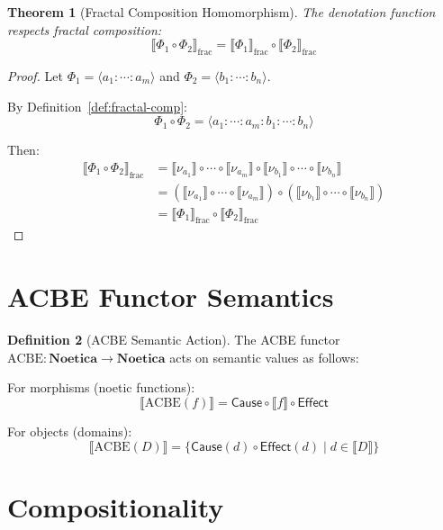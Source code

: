 \documentclass[11pt,twoside,openright]{book}
\theoremstyle{definition}
\newtheorem{definition}{Definition}[chapter]
\theoremstyle{plain}
\newtheorem{theorem}[definition]{Theorem}
\theoremstyle{remark}
\newcommand{\noe}[1]{\nu_{#1}}
\newcommand{\Frac}{\Phi}
\begin{document}
\begin{theorem}[Fractal Composition Homomorphism]
\label{thm:fractal-homomorphism}
The denotation function respects fractal composition:
\[
\llbracket \Frac_1 \circ \Frac_2 \rrbracket_{\text{frac}} = \llbracket \Frac_1 \rrbracket_{\text{frac}} \circ \llbracket \Frac_2 \rrbracket_{\text{frac}}
\]
\end{theorem}

\begin{proof}
Let $\Frac_1 = \langle a_1 : \cdots : a_m \rangle$ and $\Frac_2 = \langle b_1 : \cdots : b_n \rangle$.

By Definition~\ref{def:fractal-comp}:
\[
\Frac_1 \circ \Frac_2 = \langle a_1 : \cdots : a_m : b_1 : \cdots : b_n \rangle
\]

Then:
\begin{align}
\llbracket \Frac_1 \circ \Frac_2 \rrbracket_{\text{frac}}
&= \llbracket \noe{a_1} \rrbracket \circ \cdots \circ \llbracket \noe{a_m} \rrbracket \circ \llbracket \noe{b_1} \rrbracket \circ \cdots \circ \llbracket \noe{b_n} \rrbracket \\
&= (\llbracket \noe{a_1} \rrbracket \circ \cdots \circ \llbracket \noe{a_m} \rrbracket) \circ (\llbracket \noe{b_1} \rrbracket \circ \cdots \circ \llbracket \noe{b_n} \rrbracket) \\
&= \llbracket \Frac_1 \rrbracket_{\text{frac}} \circ \llbracket \Frac_2 \rrbracket_{\text{frac}}
\end{align}
\end{proof}

\section{ACBE Functor Semantics}

\begin{definition}[ACBE Semantic Action]
\label{def:acbe-semantics}
The ACBE functor $\text{ACBE} : \mathbf{Noetica} \to \mathbf{Noetica}$ acts on semantic values as follows:

For morphisms (noetic functions):
\[
\llbracket \text{ACBE}(f) \rrbracket = \mathsf{Cause} \circ \llbracket f \rrbracket \circ \mathsf{Effect}
\]

For objects (domains):
\[
\llbracket \text{ACBE}(D) \rrbracket = \{ \mathsf{Cause}(d) \circ \mathsf{Effect}(d) \mid d \in \llbracket D \rrbracket \}
\]
\end{definition}

\section{Compositionality}
\end{document}
